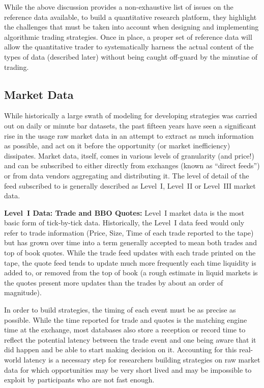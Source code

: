 While the above discussion provides a non-exhaustive list of issues on the reference data available, to build a quantitative research platform, they highlight the challenges that must be taken into account when designing and implementing algorithmic trading strategies. Once in place, a proper set of reference data will allow the quantitative trader to systematically harness the actual content of the types of data (described later) without being caught off-guard by the minutiae of trading.



\subsection{Market Data\label{subsec:marketdata}}

While historically a large swath of modeling for developing strategies was carried out on daily or minute bar datasets, the past fifteen years have seen a significant rise in the usage raw market data in an attempt to extract as much information as possible, and act on it before the opportunity (or market inefficiency) dissipates. Market data, itself, comes in various levels of granularity (and price!) and can be subscribed to either directly from exchanges (known as ``direct feeds'') or from data vendors aggregating and distributing it. The level of detail of the feed subscribed to is generally described as Level~I, Level~II or Level~III market data.\twomedskip


\noindent\textbf{Level~I Data: Trade and BBO Quotes:} Level~I market data is the most basic form of tick-by-tick data. Historically, the Level~I data feed would only refer to trade information (Price, Size, Time of each trade reported to the tape) but has grown over time into a term generally accepted to mean both trades and top of book quotes. While the trade feed updates with each trade printed on the tape, the quote feed tends to update much more frequently each time liquidity is added to, or removed from the top of book (a rough estimate in liquid markets is the quotes present more updates than the trades by about an order of magnitude). 


In order to build strategies, the timing of each event must be as precise as possible. While the time reported for trade and quotes is the matching engine time at the exchange, most databases also store a reception or record time to reflect the potential latency between the trade event and one being aware that it did happen and be able to start making decision on it. Accounting for this real-world latency is a necessary step for researchers building strategies on raw market data for which opportunities may be very short lived and may be impossible to exploit by participants who are not fast enough.


